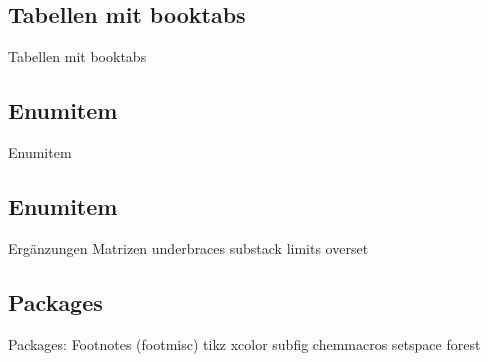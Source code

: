 \subsection{Tabellen mit booktabs}
\begin{frame}[c]
	\begin{center}
		\large Tabellen mit booktabs
	\end{center}
\end{frame}
\subsection{Enumitem}
\begin{frame}[c]
	\begin{center}
		\large Enumitem
	\end{center}
\end{frame}
\subsection{Enumitem}
\begin{frame}[c]
	\begin{center}
		\large Ergänzungen Matrizen  underbraces substack limits overset 
	\end{center}
\end{frame}


\subsection{Packages}
\begin{frame}[c]
	\begin{center}
		\large Packages:  Footnotes (footmisc)  
		tikz  xcolor subfig  chemmacros setspace forest
	\end{center}
\end{frame}


